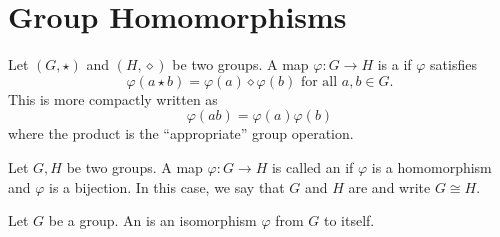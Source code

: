 \section{Group Homomorphisms}

\begin{defn}
    Let $(G, \star)$ and $(H, \diamond)$ be two groups. A map $\varphi \colon G \to H$ is a  if $\varphi$ satisfies 
    \[
        \varphi(a \star b) = \varphi(a) \diamond \varphi(b) \text{ for all } a,b \in G.
    \]
    This is more compactly written as
    \[
        \varphi(ab) = \varphi(a)\varphi(b)
    \]
    where the product is the ``appropriate'' group operation.
\end{defn}

\begin{defn}
    Let $G,H$ be two groups. A map $\varphi \colon G \to H$ is called an  if $\varphi$ is a homomorphism and $\varphi$ is a bijection. In this case, we say that $G$ and $H$ are  and write $G \cong H$.
\end{defn}

\begin{defn}
    Let $G$ be a group. An  is an isomorphism $\varphi$ from $G$ to itself. 
\end{defn}


